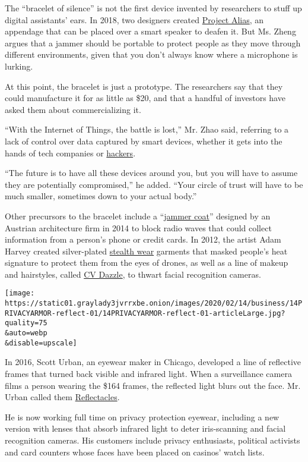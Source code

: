 The ``bracelet of silence'' is not the first device invented by
researchers to stuff up digital assistants' ears. In 2018, two designers
created \href{http://bjoernkarmann.dk/project_alias}{Project Alias}, an
appendage that can be placed over a smart speaker to deafen it. But Ms.
Zheng argues that a jammer should be portable to protect people as they
move through different environments, given that you don't always know
where a microphone is lurking.

At this point, the bracelet is just a prototype. The researchers say
that they could manufacture it for as little as \$20, and that a handful
of investors have asked them about commercializing it.

``With the Internet of Things, the battle is lost,'' Mr. Zhao said,
referring to a lack of control over data captured by smart devices,
whether it gets into the hands of tech companies or
\href{https://www.nytimes3xbfgragh.onion/2019/12/15/us/Hacked-ring-home-security-cameras.html}{hackers}.

``The future is to have all these devices around you, but you will have
to assume they are potentially compromised,'' he added. ``Your circle of
trust will have to be much smaller, sometimes down to your actual
body.''

Other precursors to the bracelet include a
``\href{http://www.coop-himmelblau.at/architecture/projects/chbl-jammer-coat}{jammer
coat}'' designed by an Austrian architecture firm in 2014 to block radio
waves that could collect information from a person's phone or credit
cards. In 2012, the artist Adam Harvey created silver-plated
\href{https://ahprojects.com/stealth-wear/}{stealth wear} garments that
masked people's heat signature to protect them from the eyes of drones,
as well as a line of makeup and hairstyles, called
\href{https://cvdazzle.com/}{CV Dazzle}, to thwart facial recognition
cameras.

\texttt{[image: https://static01.graylady3jvrrxbe.onion/images/2020/02/14/business/14PRIVACYARMOR-reflect-01/14PRIVACYARMOR-reflect-01-articleLarge.jpg?quality=75\\\&auto=webp\\\&disable=upscale]}

In 2016, Scott Urban, an eyewear maker in Chicago, developed a line of
reflective frames that turned back visible and infrared light. When a
surveillance camera films a person wearing the \$164 frames, the
reflected light blurs out the face. Mr. Urban called them
\href{https://www.reflectacles.com/}{Reflectacles}.

He is now working full time on privacy protection eyewear, including a
new version with lenses that absorb infrared light to deter
iris-scanning and facial recognition cameras. His customers include
privacy enthusiasts, political activists and card counters whose faces
have been placed on casinos' watch lists.

